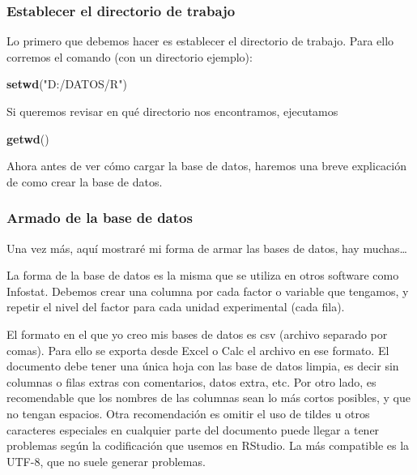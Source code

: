 \documentclass[
]{article}
\newenvironment{Shaded}{\begin{snugshade}}{\end{snugshade}}
\newcommand{\FunctionTok}[1]{\textcolor[rgb]{0.13,0.29,0.53}{\textbf{#1}}}
\newcommand{\NormalTok}[1]{#1}
\newcommand{\StringTok}[1]{\textcolor[rgb]{0.31,0.60,0.02}{#1}}
\begin{document}
\subsubsection{Establecer el directorio de
trabajo}\label{establecer-el-directorio-de-trabajo}

Lo primero que debemos hacer es establecer el directorio de trabajo.
Para ello corremos el comando (con un directorio ejemplo):

\begin{Shaded}
\begin{Highlighting}[]
\FunctionTok{setwd}\NormalTok{(}\StringTok{"D:/DATOS/R"}\NormalTok{)}
\end{Highlighting}
\end{Shaded}

Si queremos revisar en qué directorio nos encontramos, ejecutamos

\begin{Shaded}
\begin{Highlighting}[]
\FunctionTok{getwd}\NormalTok{()}
\end{Highlighting}
\end{Shaded}

Ahora antes de ver cómo cargar la base de datos, haremos una breve
explicación de como crear la base de datos.

\subsubsection{Armado de la base de
datos}\label{armado-de-la-base-de-datos}

Una vez más, aquí mostraré mi forma de armar las bases de datos, hay
muchas\ldots{}

La forma de la base de datos es la misma que se utiliza en otros
software como Infostat. Debemos crear una columna por cada factor o
variable que tengamos, y repetir el nivel del factor para cada unidad
experimental (cada fila).

El formato en el que yo creo mis bases de datos es csv (archivo separado
por comas). Para ello se exporta desde Excel o Calc el archivo en ese
formato. El documento debe tener una única hoja con las base de datos
limpia, es decir sin columnas o filas extras con comentarios, datos
extra, etc. Por otro lado, es recomendable que los nombres de las
columnas sean lo más cortos posibles, y que no tengan espacios. Otra
recomendación es omitir el uso de tildes u otros caracteres especiales
en cualquier parte del documento puede llegar a tener problemas según la
codificación que usemos en RStudio. La más compatible es la UTF-8, que
no suele generar problemas.
\end{document}
